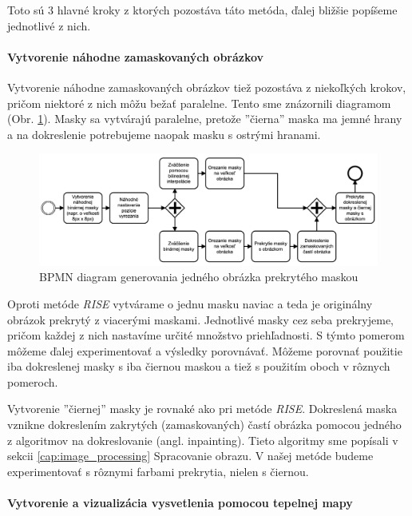 Toto sú 3 hlavné kroky z ktorých pozostáva táto metóda, ďalej bližšie popíšeme jednotlivé z nich.

\paragraph{Vytvorenie náhodne zamaskovaných obrázkov}

Vytvorenie náhodne zamaskovaných obrázkov tiež pozostáva z niekoľkých krokov, pričom niektoré z nich môžu bežať paralelne. Tento sme znázornili diagramom (Obr. \ref{fig:risei_diagram}). Masky sa vytvárajú paralelne, pretože ''čierna'' maska ma jemné hrany a na dokreslenie potrebujeme naopak masku s ostrými hranami.

\begin{figure}[h!]
    \centering
    \includegraphics[scale=0.45]{assets/images/risei_diagram.png}
    \caption{BPMN diagram generovania jedného obrázka prekrytého maskou}
    \label{fig:risei_diagram}
\end{figure}

Oproti metóde \textit{RISE} vytvárame o jednu masku naviac a teda je originálny obrázok prekrytý z viacerými maskami. Jednotlivé masky cez seba prekryjeme, pričom každej z nich nastavíme určité množstvo priehľadnosti. S týmto pomerom môžeme ďalej experimentovať a výsledky porovnávať. Môžeme porovnať použitie iba dokreslenej masky s iba čiernou maskou a tiež s použitím oboch v rôznych pomeroch.

Vytvorenie ''čiernej'' masky je rovnaké ako pri metóde \textit{RISE}. Dokreslená maska vznikne dokreslením zakrytých (zamaskovaných) častí obrázka pomocou jedného z algoritmov na dokreslovanie (angl. inpainting). Tieto algoritmy sme popísali v sekcii \ref{cap:image_processing} Spracovanie obrazu. V našej metóde budeme experimentovať s rôznymi farbami prekrytia, nielen s čiernou.

\paragraph{Vytvorenie a vizualizácia vysvetlenia pomocou tepelnej mapy}

